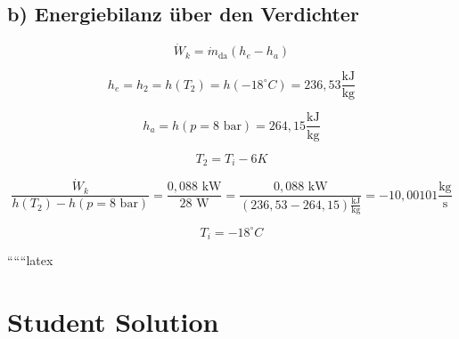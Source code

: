 \subsection*{b) Energiebilanz über den Verdichter}

\[
\dot{W}_k = \dot{m}_{\text{da}} (h_e - h_a)
\]

\[
h_e = h_2 = h(T_2) = h(-18^\circ C) = 236,53 \frac{\text{kJ}}{\text{kg}}
\]

\[
h_a = h(p = 8 \text{ bar}) = 264,15 \frac{\text{kJ}}{\text{kg}}
\]

\[
T_2 = T_i - 6 K
\]

\[
\frac{\dot{W}_k}{h(T_2) - h(p = 8 \text{ bar})} = \frac{0,088 \text{ kW}}{28 \text{ W}} = \frac{0,088 \text{ kW}}{(236,53 - 264,15) \frac{\text{kJ}}{\text{kg}}} = -10,00101 \frac{\text{kg}}{\text{s}}
\]

\[
T_i = -18^\circ C
\]

``````latex


\section*{Student Solution}